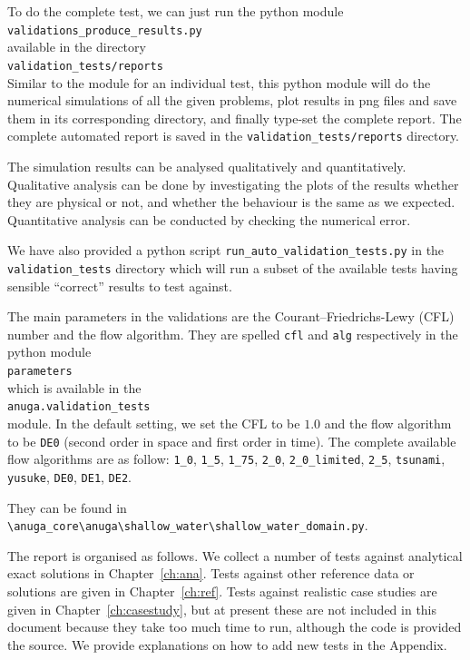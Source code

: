 To do the complete test, we can just run the python module \\
\verb|validations_produce_results.py| \\
available in the directory \\
\verb|validation_tests/reports| \\
Similar to the module for an individual test, this python module
will do the numerical simulations of all the given problems,
plot results in png files and save them in its corresponding directory,
and finally type-set the complete report. The complete automated report is saved in the
\verb|validation_tests/reports| directory.

The simulation results can be analysed qualitatively and quantitatively.
Qualitative analysis can be done by investigating the plots of
the results whether they are physical or not, and whether the
behaviour is the same as we expected. Quantitative analysis can
be conducted by checking the numerical error.

We have also provided a python script \verb|run_auto_validation_tests.py| in
the \verb|validation_tests| directory which will run a subset of the available tests
having sensible ``correct'' results to test against.

The main parameters in the validations are the Courant--Friedrichs-Lewy (CFL)
number and the flow algorithm. They are spelled
\verb|cfl| and \verb|alg| respectively in the python module \\
\verb|parameters| \\
which is available in the \\
\verb|anuga.validation_tests| \\
module. In the default setting, we set the CFL to be $1.0$ and
the flow algorithm to be \verb|DE0| (second order in space and first order in time).
The complete available flow algorithms are as follow:
\verb|1_0|,
\verb|1_5|,
\verb|1_75|,
\verb|2_0|,
\verb|2_0_limited|,
\verb|2_5|,
\verb|tsunami|,
\verb|yusuke|,
\verb|DE0|,
\verb|DE1|,
\verb|DE2|.

They can be found in \\
\verb|\anuga_core\anuga\shallow_water\shallow_water_domain.py|.



The report is organised as follows. We collect a number of tests against
analytical exact solutions in Chapter~\ref{ch:ana}. Tests against other
reference data or solutions are given in Chapter~\ref{ch:ref}. Tests against
realistic case studies are given in Chapter~\ref{ch:casestudy}, but at present
these are not included in this document because they take too much time to run,
although the code is provided the source. We provide explanations on how to add
new tests in the Appendix.

